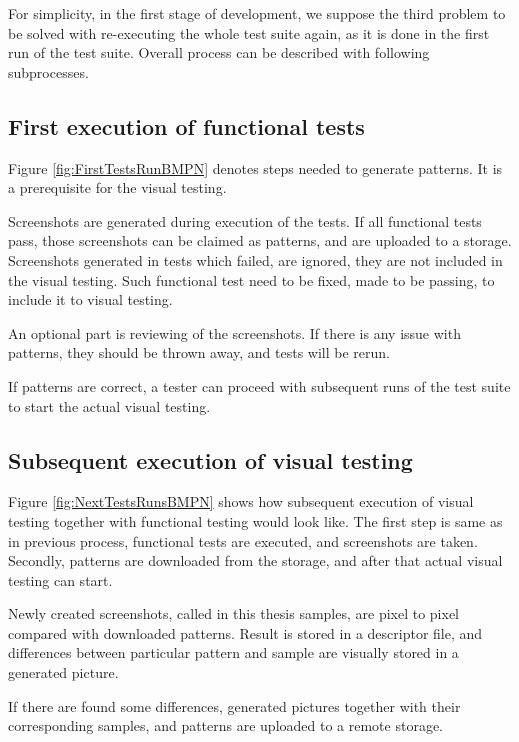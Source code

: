 \documentclass[11pt,oneside,final]{fithesis2}
\begin{document}
  For simplicity, in the first stage of development, we suppose the third problem to be solved with re-executing the whole test suite
  again, as it is done in the first run of the test suite. Overall process can be described with following subprocesses.
  
  \subsection{First execution of functional tests}
  \label{chap:firstRunProc}
  
  Figure \ref{fig:FirstTestsRunBMPN} denotes steps needed to generate patterns. It is a prerequisite for the visual testing.
  
  Screenshots are generated during execution of the tests. If all functional tests pass, those screenshots
  can be claimed as patterns, and are uploaded to a storage. Screenshots generated in tests which failed, are ignored, they are
  not included in the visual testing. Such functional test need to be fixed, made to be passing, to include it to visual testing.
  
  An optional part is reviewing of the screenshots. If there is any issue with patterns, they should be thrown away, and tests will be rerun.
  
  If patterns are correct, a tester can proceed with subsequent runs of the test suite to start the actual visual testing.
  
  \subsection{Subsequent execution of visual testing}
  
  Figure \ref{fig:NextTestsRunsBMPN} shows how subsequent execution of visual testing together with functional testing would look like. The first step is same as in previous process,
  functional tests are executed, and screenshots are taken. Secondly, patterns are downloaded from the storage, and after that actual visual testing can start.
  
  Newly created screenshots, called in this thesis samples, are pixel to pixel compared with downloaded patterns. Result is stored in a descriptor file, and differences between particular
  pattern and sample are visually stored in a generated picture.
  
  If there are found some differences, generated pictures together with their corresponding samples, and patterns are uploaded to a remote storage.
  
\end{document}

